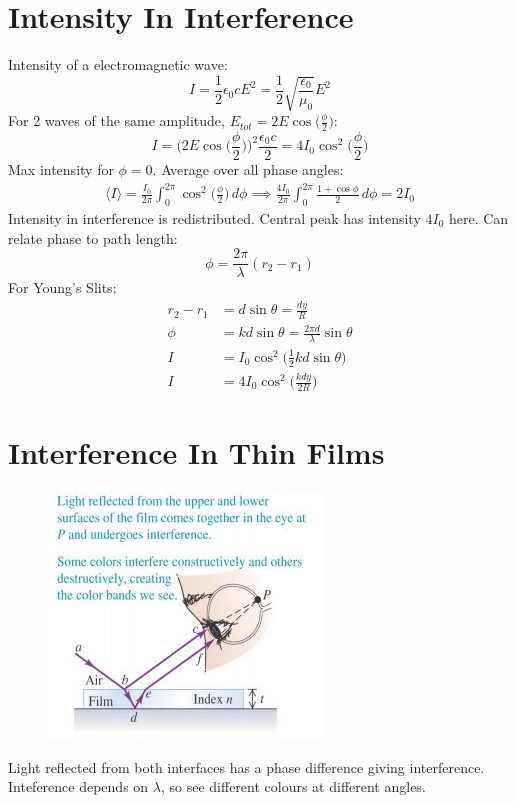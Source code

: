 \documentclass[a4paper, 11pt, normalem]{report}
\begin{document}
\section{Intensity In Interference}
Intensity of a electromagnetic wave:
\begin{equation}
    I = \frac{1}{2}\epsilon_{0}cE^{2} = \frac{1}{2}\sqrt{\frac{\epsilon_{0}}{\mu_{0}}}E^{2}
\end{equation}
For 2 waves of the same amplitude, $E_{tot} = 2E\cos{\Big(\frac{\phi}{2}\Big)}$:
\begin{equation}
    I = \Big(2E\cos{\Big(\frac{\phi}{2}\Big)}\Big)^{2} \frac{\epsilon_{0}c}{2} = 4I_{0}\cos^{2}{\Big(\frac{\phi}{2}\Big)}
\end{equation}
Max intensity for $\phi = 0$.
Average over all phase angles:
\begin{align}
    \langle I\rangle = \frac{I_{0}}{2\pi}\int_{0}^{2\pi}\cos^{2}{\Big(\frac{\phi}{2}\Big)}\, d\phi \implies \frac{4I_{0}}{2\pi}\int_{0}^{2\pi}\frac{1 + \cos{\phi}}{2}\, d\phi = 2I_{0}
\end{align}
Intensity in interference is redistributed.
Central peak has intensity $4I_{0}$ here.
Can relate phase to path length:
\begin{equation}
    \phi = \frac{2\pi}{\lambda}(r_{2} - r_{1})
\end{equation}
For Young's Slits:
\begin{align}
    r_{2} - r_{1} &= d\sin{\theta} = \frac{dy}{R} \\
    \phi &= kd\sin{\theta} = \frac{2\pi d}{\lambda}\sin{\theta} \\
    I &= I_{0}\cos^{2}{\Big(\frac{1}{2}kd\sin{\theta}\Big)} \\
    I &= 4I_{0}\cos^{2}{\Big(\frac{kdy}{2R}\Big)}
\end{align}

\section{Interference In Thin Films}
\begin{figure}[H]
    \centering
    \includegraphics{Film.jpg} 
\end{figure}
Light reflected from both interfaces has a phase difference giving interference.
Inteference depends on $\lambda$, so see different colours at different angles.
\end{document}
